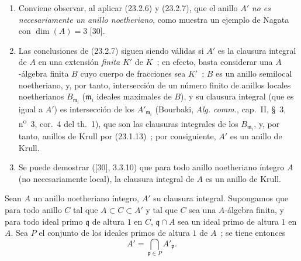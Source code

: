 \begin{remarks}[23.2.8]
\label{0.23.2.8-es}
\begin{enumerate}
  \item[(i)] Conviene observar, al aplicar (23.2.6) y
  (23.2.7), que el anillo $A'$ \emph{no es necesariamente un anillo
  noetheriano}, como muestra un ejemplo de Nagata con $\dim(A)=3$ [30].

  \item[(ii)] Las conclusiones de (23.2.7) siguen siendo válidas si $A'$ es
  la clausura integral de $A$ en una extensión \emph{finita} $K'$ de $K$~; en efecto,
  basta considerar una $A$-álgebra finita $B$ cuyo cuerpo de fracciones sea
  $K'$~; $B$ es un anillo semilocal noetheriano, y, por tanto,
  intersección de un número finito de anillos locales noetherianos
  $B_{\mathfrak m_i}$ ($\mathfrak m_i$ ideales maximales de $B$), y su clausura
  integral (que es igual a $A'$) es intersección de los
  $A'_{\mathfrak m_i}$ (Bourbaki, \emph{Alg. comm.}, cap.~II, §~3,
  n\textsuperscript{o}~3, cor.~4 del th.~1), que son las clausuras integrales
  de los $B_{\mathfrak m_i}$, y, por tanto, anillos de Krull por (23.1.13)~; por
  consiguiente, $A'$ es un anillo de Krull.

  \item[(iii)] Se puede demostrar ([30], 3.3.10) que para todo anillo noetheriano
  íntegro $A$ (no necesariamente local), la clausura integral de $A$ es un
  anillo de Krull.
\end{enumerate}
\end{remarks}

\begin{corollary}[23.2.9]
\label{0.23.2.9-es}
Sean $A$ un anillo noetheriano íntegro, $A'$ su clausura integral. Supongamos
que para todo anillo $C$ tal que $A\subset C\subset A'$ y tal que $C$ sea
una $A$-álgebra finita, y para todo ideal primo $\mathfrak q$ de altura $1$
en $C$, $\mathfrak q\cap A$ sea un ideal primo de altura $1$ en $A$.
Sea $P$ el conjunto de los ideales primos de altura $1$ de $A$~; se tiene entonces
\[
  A'=\bigcap_{\mathfrak p\in P}A'_{\mathfrak p}.
\]
\end{corollary}

